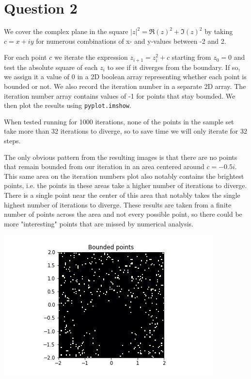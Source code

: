 \documentclass{article}
\begin{document}
\section*{Question 2}

We cover the complex plane in the square $|z|^2 = \Re(z)^2 + \Im(z)^2$ by taking $c = x + iy$ for numerous combinations of x- and y-values between -2 and 2.

For each point $c$ we iterate the expression $z_{i + 1} = z_i^2 + c$ starting from $z_0 = 0$ and test the absolute square of each $z_i$ to see if it diverges from the boundary. If so, we assign it a value of 0 in a 2D boolean array representing whether each point is bounded or not. We also record the iteration number in a separate 2D array. The iteration number array contains values of -1 for points that stay bounded. We then plot the results using \texttt{pyplot.imshow}.

When tested running for 1000 iterations, none of the points in the sample set take more than 32 iterations to diverge, so to save time we will only iterate for 32 steps.

The only obvious pattern from the resulting images is that there are no points that remain bounded from our iteration in an area centered around $c = -0.5i$. This same area on the iteration numbers plot also notably contains the brightest points, i.e. the points in these areas take a higher number of iterations to diverge. There is a single point near the center of this area that notably takes the single highest number of iterations to diverge. These results are taken from a finite number of points across the area and not every possible point, so there could be more "interesting" points that are missed by numerical analysis.

\includegraphics[scale=0.7]{plot2_1}
\end{document}
